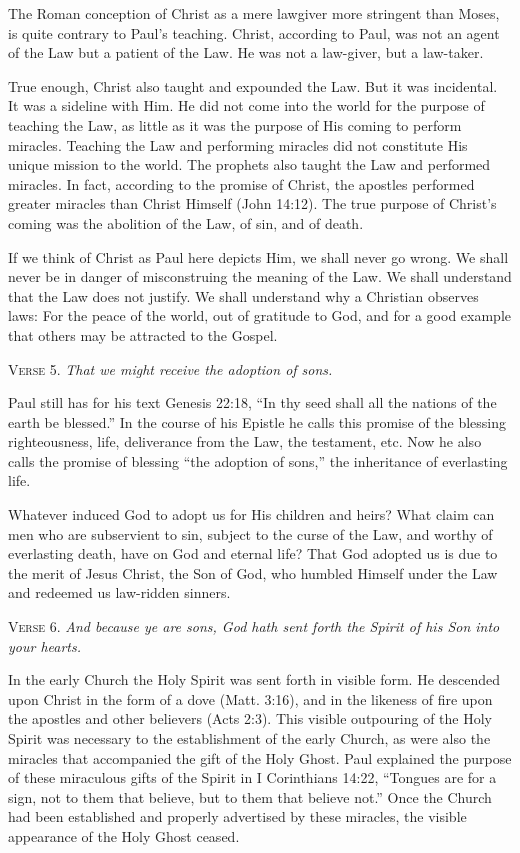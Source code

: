 The Roman conception of Christ as a mere lawgiver more stringent than Moses, is quite contrary to Paul’s teaching. Christ, according to Paul, was not an agent of the Law but a patient of the Law. He was not a law-giver, but a law-taker.

True enough, Christ also taught and expounded the Law. But it was incidental. It was a sideline with Him. He did not come into the world for the purpose of teaching the Law, as little as it was the purpose of His coming to perform miracles. Teaching the Law and performing miracles did not constitute His unique mission to the world. The prophets also taught the Law and performed miracles. In fact, according to the promise of Christ, the apostles performed greater miracles than Christ Himself (John 14:12). The true purpose of Christ’s coming was the abolition of the Law, of sin, and of death.

If we think of Christ as Paul here depicts Him, we shall never go wrong. We shall never be in danger of misconstruing the meaning of the Law. We shall understand that the Law does not justify. We shall understand why a Christian observes laws: For the peace of the world, out of gratitude to God, and for a good example that others may be attracted to the Gospel.

\textsc{Verse} 5. \emph{That we might receive the adoption of sons.}

Paul still has for his text Genesis 22:18, “In thy seed shall all the nations of the earth be blessed.” In the course of his Epistle he calls this promise of the blessing righteousness, life, deliverance from the Law, the testament, etc. Now he also calls the promise of blessing “the adoption of sons,” the inheritance of everlasting life.

Whatever induced God to adopt us for His children and heirs? What claim can men who are subservient to sin, subject to the curse of the Law, and worthy of everlasting death, have on God and eternal life? That God adopted us is due to the merit of Jesus Christ, the Son of God, who humbled Himself under the Law and redeemed us law-ridden sinners.

\textsc{Verse} 6. \emph{And because ye are sons, God hath sent forth the Spirit of his Son into your hearts.}

In the early Church the Holy Spirit was sent forth in visible form. He descended upon Christ in the form of a dove (Matt. 3:16), and in the likeness of fire upon the apostles and other believers (Acts 2:3). This visible outpouring of the Holy Spirit was necessary to the establishment of the early Church, as were also the miracles that accompanied the gift of the Holy Ghost. Paul explained the purpose of these miraculous gifts of the Spirit in I Corinthians 14:22, “Tongues are for a sign, not to them that believe, but to them that believe not.” Once the Church had been established and properly advertised by these miracles, the visible appearance of the Holy Ghost ceased.

